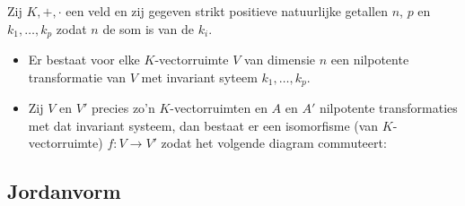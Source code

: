 \documentclass[main.tex]{subfiles}
\begin{document}
\begin{pr}
  Zij $K,+,\cdot$ een veld en zij gegeven strikt positieve natuurlijke getallen $n$, $p$ en $k_{1}, \dotsc, k_{p}$ zodat $n$ de som is van de $k_{i}$.
  \begin{itemize}
  \item Er bestaat voor elke $K$-vectorruimte $V$ van dimensie $n$ een nilpotente transformatie van $V$ met invariant syteem $k_{1}, \dotsc, k_{p}$.
  \item Zij $V$ en $V'$ precies zo'n $K$-vectorruimten en $A$ en $A'$ nilpotente transformaties met dat invariant systeem, dan bestaat er een isomorfisme (van $K$-vectorruimte) $f: V\rightarrow V'$ zodat het volgende diagram commuteert:
    \begin{figure}[H]
      \centering
    \end{figure}
  \end{itemize}
\end{pr}

\subsection{Jordanvorm}
\label{sec:jordanvorm}
\end{document}
